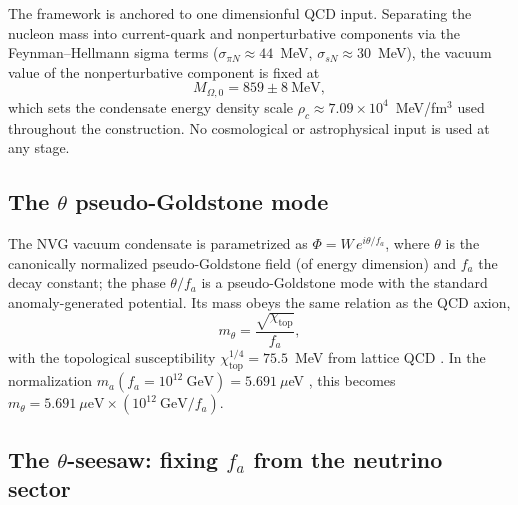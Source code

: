 \documentclass[11pt,a4paper]{article}
\begin{document}
The framework is anchored to one dimensionful QCD input. Separating the nucleon
mass into current-quark and nonperturbative components via the Feynman--Hellmann
sigma terms ($\sigma_{\pi N} \approx 44$~MeV, $\sigma_{sN} \approx 30$~MeV),
the vacuum value of the nonperturbative component is fixed at
\cite{VMFanchor}
\begin{equation}
M_{\Omega,0} = 859 \pm 8~\text{MeV},
\end{equation}
which sets the condensate energy density scale
$\rho_c \approx 7.09\times 10^{4}$~MeV/fm$^{3}$ used throughout the
construction. No cosmological or astrophysical input is used at any stage.

\subsection{The $\theta$ pseudo-Goldstone mode}

The NVG vacuum condensate is parametrized as $\Phi = W\,e^{i\theta/f_a}$, where
$\theta$ is the canonically normalized pseudo-Goldstone field (of energy
dimension) and $f_a$ the decay constant; the phase $\theta/f_a$ is a
pseudo-Goldstone mode with the standard anomaly-generated
potential. Its mass obeys the same relation as the QCD axion,
\begin{equation}
m_\theta = \frac{\sqrt{\chi_{\mathrm{top}}}}{f_a},
\label{eq:mtheta}
\end{equation}
with the topological susceptibility $\chi_{\mathrm{top}}^{1/4} = 75.5$~MeV from
lattice QCD \cite{QCDaxionPrecisely}. In the normalization
$m_a(f_a = 10^{12}~\text{GeV}) = 5.691~\mu$eV \cite{QCDaxionPrecisely}, this
becomes $m_\theta = 5.691~\mu\text{eV}\times (10^{12}~\text{GeV}/f_a)$.

\subsection{The $\theta$-seesaw: fixing $f_a$ from the neutrino sector}
\label{sec:seesaw}
\end{document}
